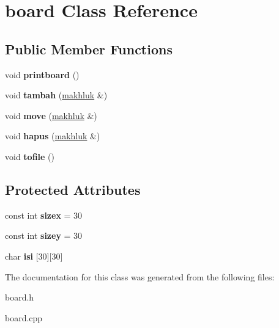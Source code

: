 \hypertarget{classboard}{}\section{board Class Reference}
\label{classboard}
\subsection*{Public Member Functions}
\begin{DoxyCompactItemize}
\item 
void {\bfseries printboard} ()\hypertarget{classboard_a6e982dd9f066e8bdd47e62dcb2b58d4d}{}\label{classboard_a6e982dd9f066e8bdd47e62dcb2b58d4d}

\item 
void {\bfseries tambah} (\hyperlink{classmakhluk}{makhluk} \&)\hypertarget{classboard_ae032573539a2aaecc8416ebde30d4ccd}{}\label{classboard_ae032573539a2aaecc8416ebde30d4ccd}

\item 
void {\bfseries move} (\hyperlink{classmakhluk}{makhluk} \&)\hypertarget{classboard_abc546e7b17944d8135f101776cb12be8}{}\label{classboard_abc546e7b17944d8135f101776cb12be8}

\item 
void {\bfseries hapus} (\hyperlink{classmakhluk}{makhluk} \&)\hypertarget{classboard_a1b16f7efa467fd465477181d8daf12bd}{}\label{classboard_a1b16f7efa467fd465477181d8daf12bd}

\item 
void {\bfseries tofile} ()\hypertarget{classboard_a541f795cb1106060602b381723c3bd7b}{}\label{classboard_a541f795cb1106060602b381723c3bd7b}

\end{DoxyCompactItemize}
\subsection*{Protected Attributes}
\begin{DoxyCompactItemize}
\item 
const int {\bfseries sizex} = 30\hypertarget{classboard_a3da53c304c897ae66fa021d153c6e175}{}\label{classboard_a3da53c304c897ae66fa021d153c6e175}

\item 
const int {\bfseries sizey} = 30\hypertarget{classboard_a2489f58a0ee5032a5ba2895cd3852a47}{}\label{classboard_a2489f58a0ee5032a5ba2895cd3852a47}

\item 
char {\bfseries isi} \mbox{[}30\mbox{]}\mbox{[}30\mbox{]}\hypertarget{classboard_af9c1f553b476ba832d7aafc33cc4cbfc}{}\label{classboard_af9c1f553b476ba832d7aafc33cc4cbfc}

\end{DoxyCompactItemize}


The documentation for this class was generated from the following files\+:\begin{DoxyCompactItemize}
\item 
board.\+h\item 
board.\+cpp\end{DoxyCompactItemize}
